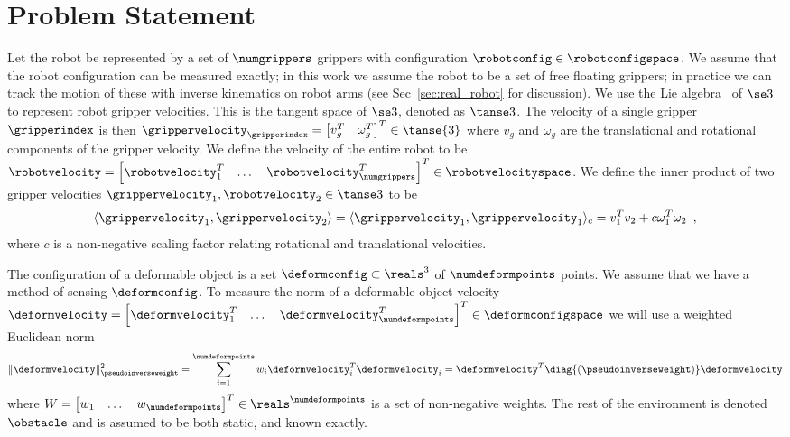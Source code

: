\section{Problem Statement}

Let the robot be represented by a set of $\numgrippers$ grippers with configuration $\robotconfig \in \robotconfigspace$.  We assume that the robot configuration can be measured exactly; in this work we assume the robot to be a set of free floating grippers; in practice we can track the motion of these with inverse kinematics on robot arms (see Sec~\ref{sec:real_robot} for discussion). We use the Lie algebra~\cite{Murray1994} of $\se3$ to represent robot gripper velocities. This is the tangent space of $\se3$, denoted as $\tanse3$. The velocity of a single gripper $\gripperindex$ is then $\grippervelocity_\gripperindex = \begin{bmatrix}v_g^T & \omega_g^T\end{bmatrix}^T \in \tanse{3}$ where $v_g$ and $\omega_g$ are the translational and rotational components of the gripper velocity. We define the velocity of the entire robot to be $\robotvelocity = \begin{bmatrix}\robotvelocity_1^T & \dots & \robotvelocity_\numgrippers^T \end{bmatrix}^T \in \robotvelocityspace$. We define the inner product of two gripper velocities $\grippervelocity_1, \robotvelocity_2 \in \tanse3$ to be 
\begin{equation}
    \langle \grippervelocity_1, \grippervelocity_2 \rangle = \langle \grippervelocity_1, \grippervelocity_1 \rangle_{c} = v_1^T v_2 + c \omega_1^T \omega_2 \enspace,
\end{equation}
where $c$ is a non-negative scaling factor relating rotational and translational velocities.


The configuration of a deformable object is a set $\deformconfig \subset \reals^3$ of $\numdeformpoints$ points. We assume that we have a method of sensing $\deformconfig$. To measure the norm of a deformable object velocity $\deformvelocity = \begin{bmatrix} \deformvelocity_1^T & \dots & \deformvelocity_\numdeformpoints^T \end{bmatrix}^T \in \deformconfigspace $ we will use a weighted Euclidean norm
\begin{equation}
    \| \deformvelocity \|^2_\pseudoinverseweight = \sum_{i = 1}^\numdeformpoints w_i \deformvelocity_i^T \deformvelocity_i = \deformvelocity^T \diag{(\pseudoinverseweight)} \deformvelocity
\end{equation}
where $W = \begin{bmatrix}w_1 & \dots & w_\numdeformpoints \end{bmatrix}^T \in \reals^\numdeformpoints$ is a set of non-negative weights. The rest of the environment is denoted $\obstacle$ and is assumed to be both static, and known exactly.



